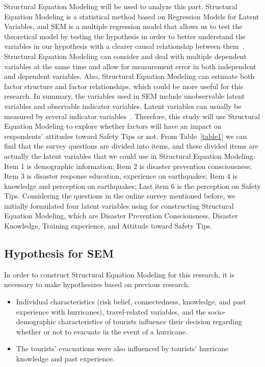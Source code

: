 Structural Equation Modeling will be used to analyze this part. Structural Equation Modeling is a statistical method based on Regression Models for Latent Variables, and SEM is a multiple regression model that allows us to test the theoretical model by testing the hypothesis in order to better understand the variables in our hypothesis with a clearer causal relationship between them~\cite{ref13}. Structural Equation Modeling can consider and deal with multiple dependent variables at the same time and allow for measurement error in both independent and dependent variables. Also, Structural Equation Modeling can estimate both factor structure and factor relationships, which could be more useful for this research. In summary, the variables used in SEM include unobservable latent variables and observable indicator variables. Latent variables can usually be measured by several indicator variables~\cite{ref14}. Therefore, this study will use Structural Equation Modeling to explore whether factors will have an impact on respondents' attitudes toward Safety Tips or not. From Table~\ref{table1} we can find that the survey questions are divided into items, and these divided items are actually the latent variables that we could use in Structural Equation Modeling. Item 1 is demographic information; Item 2 is disaster prevention consciousness; Item 3 is disaster response education, experience on earthquakes; Item 4 is knowledge and perception on earthquakes; Last item 6 is the perception on Safety Tips. Considering the questions in the online survey mentioned before, we initially formulated four latent variables using for constructing Structural Equation Modeling, which are Disaster Prevention Consciousness, Disaster Knowledge, Training experience, and Attitude toward Safety Tips.





\subsection{Hypothesis for SEM}

In order to construct Structural Equation Modeling for this research, it is necessary to make hypothesizes based on previous research.  

\begin{itemize}
\item Individual characteristics (risk belief, connectedness, knowledge, and past experience with hurricanes), travel-related variables, and the socio-demographic characteristics of tourists influence their decision regarding whether or not to evacuate in the event of a hurricane.~\cite{Cahyanto2014AnEE}
\item The tourists' evacuations were also influenced by tourists' hurricane knowledge and past experience.~\cite{Cahyanto2016StatedPO}
\end{itemize}

